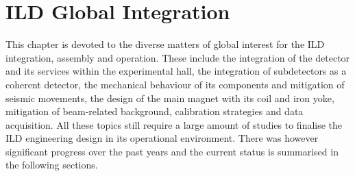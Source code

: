 \chapter{ILD Global Integration}
\label{chap:integration}

This chapter is devoted to the diverse matters of global interest for the ILD integration, assembly and operation. These include the integration of the detector and its services within the experimental hall, the integration of subdetectors as a coherent detector, the mechanical behaviour of its components and mitigation of seismic movements, the design of the main magnet with its coil and iron yoke, mitigation of beam-related background, calibration strategies and data acquisition. All these topics still require a large amount of studies to finalise the ILD engineering design in its operational environment. There was however significant progress over the past years and the current status is summarised in the following sections.   























